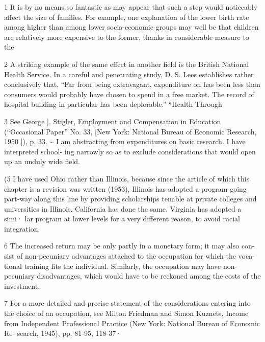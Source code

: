 \documentclass[11pt,openany]{book}
\begin{document}
{\footnotesize\setlength{\parindent}{0pt}\setlength{\parskip}{5pt}

1 It is by no means so fantastic as may appear that such a step would noticeably affect the size of families. For example, one explanation of the lower birth rate among higher than among lower socia-economic groups may well be that children are relatively more expensive to the former, thanks in considerable measure to the\par

2 A striking example of the same effect in another field is the British National Health Service. In a careful and penetrating study, D. S. Lees establishes rather conclusively that, ``Far from being extravagant, expenditure on has been less than consumers would probably have chosen to spend in a free market. The record of hospital building in particular has been deplorable.'' ``Health Through\par

3 See George ]. Stigler, Employment and Compensation in Education (``Occasional Paper'' No. 33, [New York: National Bureau of Economic Research, 1950 ]), p. 33. \textasciitilde{} I am abstracting from expenditures on basic research. I have interpreted school- ing narrowly so as to exclude considerations that would open up an unduly wide field.\par

(5 I have used Ohio rather than Illinois, because since the article of which this chapter is a revision was written (1953), Illinois has adopted a program going part-way along this line by providing scholarships tenable at private colleges and universities in Illinois. California has done the same. Virginia has adopted a simi· lar program at lower levels for a very different reason, to avoid racial integration.\par

6 The increased return may be only partly in a monetary form; it may also con- sist of non-pecuniary advantages attached to the occupation for which the voca- tional training fits the individual. Similarly, the occupation may have non-pecuniary disadvantages, which would have to be reckoned among the costs of the investment.\par

7 For a more detailed and precise statement of the considerations entering into the choice of an occupation, see Milton Friedman and Simon Kuznets, Income from Independent Professional Practice (New York: National Bureau of Economic Re- search, 1945), pp. 81-95, 118-37·\par

}
\end{document}
